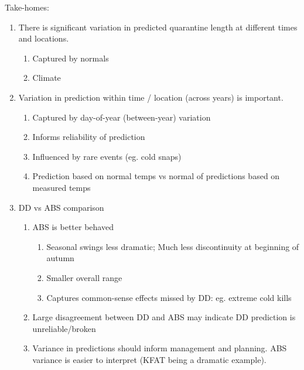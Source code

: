 \documentclass[10pt,a4paper,twocolumn]{article}
\begin{document}
Take-homes:
\begin{enumerate}
\item There is significant variation in predicted quarantine length 
at different times and locations.
  \begin{enumerate}
  \item Captured by normals
  \item Climate
  \end{enumerate}
\item Variation in prediction within time / location (across years) 
is important.
  \begin{enumerate}
  \item Captured by day-of-year (between-year) variation
  \item Informs reliability of prediction
  \item Influenced by rare events (eg. cold snaps)
  \item Prediction based on normal temps vs normal 
  of predictions based on measured temps
  \end{enumerate}
\item DD vs ABS comparison
  \begin{enumerate}
  \item ABS is better behaved
    \begin{enumerate}
    \item Seasonal swings less dramatic; 
    Much less discontinuity at beginning of autumn 
    \item Smaller overall range
    \item Captures common-sense effects missed by DD: 
    eg. extreme cold kills
    \end{enumerate}
  \item Large disagreement between DD and ABS may indicate 
  DD prediction is unreliable/broken
  \item Variance in predictions should inform management and planning.
  ABS variance is easier to interpret (KFAT being a dramatic example).
  \end{enumerate}
\end{enumerate}




\end{document}
